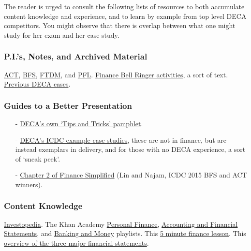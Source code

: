 \documentclass[12pt]{article}
\begin{document}
	The reader is urged to consult the following lists of resources to both accumulate content knowledge and experience, and to learn by example from top level DECA competitors. You might observe that there is overlap between what one might study for her exam and her case study.
	
\subsubsection*{P.I.'s, Notes, and Archived Material}
	
	  \href{http://www.deca.ca/documents/Performance\%20Indicators/ACT.docx}{ACT}, 
	  \href{http://www.deca.ca/documents/Performance\%20Indicators/BFS.docx}{BFS}, 
	  \href{http://www.deca.ca/documents/Performance\%20Indicators/FTDM.docx}{FTDM}, and 
	  \href{http://www.deca.ca/documents/Performance\%20Indicators/PFL.docx}{PFL}.  					\href{ilcollaborate.org/wp-content/uploads/2014/11/Finance-Indicators-Explained.docx}{Finance Bell Ringer activities}, a sort of text. \href{https://saltfleetdeca.commons.hwdsb.on.ca/sample-page/}{Previous DECA cases}.

\subsubsection*{Guides to a Better Presentation}
\begin{itemize}
	\item[-] \href{https://issuu.com/decainc/docs/deca_competitive_events_success}{DECA's own \lq Tips and Tricks' pamphlet}.
	\item[-] \href{https://www.deca.org/high-school-programs/competitive-events-sample-videos-hs/}{DECA's ICDC example case studies}, these are not in finance, but are instead exemplars in delivery, and for those with no DECA experience, a sort of \lq sneak peek'.
	\item[-] \href{http://www.deca.ca/documents/Masters/Chapter_2-Role_Play_Strategies.pdf}{Chapter 2 of Finance Simplified} (Lin and Najam, ICDC 2015 BFS and ACT winners).
\end{itemize}

\subsubsection*{Content Knowledge}
	\href{http://www.investopedia.com/}{Investopedia}. The Khan Academy \href{https://www.youtube.com/playlist?list=PL83DF21B47327EDFE}{Personal Finance},  \href{https://www.youtube.com/playlist?list=PLXuBZowfrFgYddDQpXdDtViretdX4ECKS}{Accounting and Financial Statements}, and \href{https://www.youtube.com/playlist?list=PLCECDA315A8848B99}{Banking and Money} playlists. This \href{https://www.youtube.com/watch?v=mhmaHayMha8}{5 minute finance lesson}. This \href{https://www.youtube.com/watch?v=B7300KsDdYY}{overview of the three major financial statements}. 
	
\end{document}
